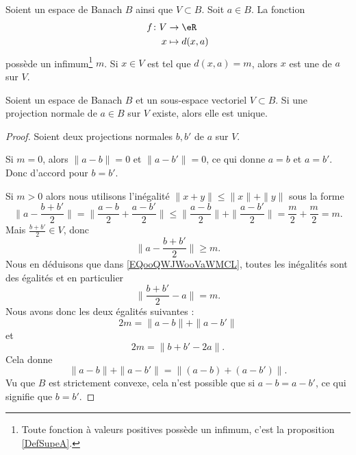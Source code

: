 	\begin{definition}      \label{DEFooMYYLooJyACPL}
		Soient un espace de Banach \( B\) ainsi que \( V\subset B\). Soit \( a\in B\). La fonction
		\begin{equation}
			\begin{aligned}
				f\colon V & \to \eR        \\
				x         & \mapsto d(x,a)
			\end{aligned}
		\end{equation}
		possède un infimum\footnote{Toute fonction à valeurs positives possède un infimum, c'est la proposition \ref{DefSupeA}.} \( m\). Si \( x\in V\) est tel que \( d(x,a)=m\), alors \( x\) est une  de \( a\) sur \( V\).
	\end{definition}

	\begin{proposition}       \label{PROPooDKXVooUoYPgz}
		Soient un espace de Banach \( B\) et un sous-espace vectoriel \( V\subset B\). Si une projection normale de \( a\in B\) sur \( V\) existe, alors elle est unique.
	\end{proposition}

	\begin{proof}
		Soient deux projections normales \( b,b'\) de \( a\) sur \( V\).

		Si \( m=0\), alors \( \| a-b \|=0\) et \( \| a-b' \|=0\), ce qui donne \( a=b\) et \( a=b'\). Donc d'accord pour \( b=b'\).

		Si \( m>0\) alors nous utilisons l'inégalité \( \| x+y \|\leq \| x \|+\| y \|\) sous la forme
		\begin{equation}        \label{EQooQWJWooVaWMCL}
			\| a-\frac{ b+b' }{ 2 } \|=\| \frac{ a-b }{2}+\frac{ a-b' }{2} \|\leq \| \frac{ a-b }{2} \|+\| \frac{ a-b' }{2} \|=\frac{ m }{ 2 }+\frac{ m }{2}=m.
		\end{equation}
		Mais \( \frac{ b+b' }{2}\in V\), donc
		\begin{equation}
			\| a-\frac{ b+b' }{2} \|\geq m.
		\end{equation}
		Nous en déduisons que dans \eqref{EQooQWJWooVaWMCL}, toutes les inégalités sont des égalités et en particulier
		\begin{equation}
			\| \frac{ b+b' }{2}-a \|=m.
		\end{equation}
		Nous avons donc les deux égalités suivantes :
		\begin{equation}
			2m=\| a-b \|+\| a-b' \|
		\end{equation}
		et
		\begin{equation}
			2m=\| b+b'-2a \|.
		\end{equation}
		Cela donne
		\begin{equation}
			\| a-b \|+\| a-b' \|=\| (a-b)+(a-b') \|.
		\end{equation}
		Vu que \( B\) est strictement convexe, cela n'est possible que si \( a-b=a-b'\), ce qui signifie que \( b=b'\).
	\end{proof}


